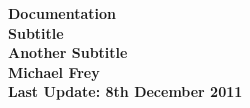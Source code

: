 \documentclass[paper=a4,nenglish]{scrartcl}
\begin{document}
\begin{titlepage}   


\setlength{\parindent}{0em}   

\begin{minipage}{170mm} 
  \begin{minipage}{5cm}
    \par\vspace*{4mm}
  \end{minipage}
  \begin{minipage}{6cm}
    \hfill
  \end{minipage}
  \begin{minipage}{5cm} 
    \centering
  \end{minipage}   
\end{minipage}  
\smallskip  \centering
  \begin{minipage}{\textwidth}     \centering     \vspace{5cm}
    \renewcommand{\baselinestretch}{1.8}    \small\normalsize     {\Huge \bf
    Documentation  \\ \normalsize Subtitle \\ Another Subtitle}\\ \vspace{2cm} {\normalsize \bf Michael Frey}\\  \vspace{6cm} {\small \bf
    Last Update: 8th December 2011 }\\    \renewcommand{\baselinestretch}{1}
    \small\normalsize   \end{minipage}   
\clearpage 
\end{titlepage} 

\newpage
\tableofcontents
\newpage
\listoffigures
\newpage
\listoftables
\newpage
\lstlistoflistings










\end{document}

